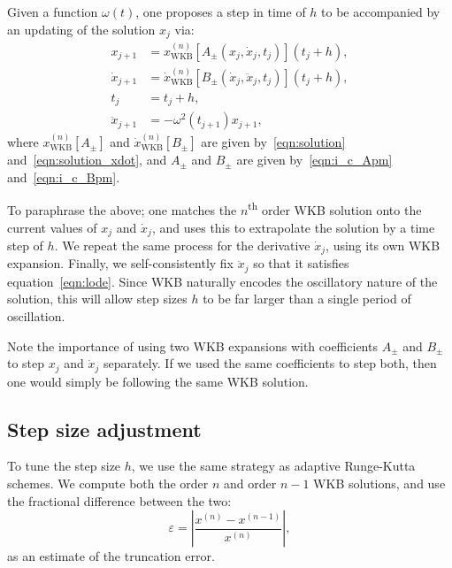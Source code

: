 Given a function \(\omega(t)\), one proposes a step in time of \(h\) to be accompanied by an updating of the solution \(x_j\) via:
\begin{align}
  x_{j+1} &= x_\mathrm{WKB}^{(n)}[A_\pm(x_j,\dot{x}_j,t_j)](t_j+h),
  \label{eqn:WKB_x_step} \\
  \dot{x}_{j+1} &= \dot{x}_\mathrm{WKB}^{(n)}[B_\pm(\dot{x}_j,\ddot{x}_j,t_j)](t_j+h),
  \label{eqn:WKB_xdot_step} \\
  t_j &= t_j+h,
  \label{eqn:WKB_t_step} \\
  \ddot{x}_{j+1} &= -\omega^2(t_{j+1})x_{j+1},
  \label{eqn:WKB_xddot} 
\end{align}
where \(x_\mathrm{WKB}^{(n)}[A_{\pm}]\) and \(\dot{x}_\mathrm{WKB}^{(n)}[B_{\pm}]\) are given by~\eqref{eqn:solution} and~\eqref{eqn:solution_xdot},  and \(A_{\pm}\) and \(B_{\pm}\)  are given by~\eqref{eqn:i_c_Apm} and~\eqref{eqn:i_c_Bpm}.

To paraphrase the above; one matches the \(n\)\textsuperscript{th} order WKB solution onto the current values of \(x_j\) and \(\dot{x}_j\), and uses this to extrapolate the solution by a time step of \(h\). We repeat the same process for the derivative \(\dot{x}_j\), using its own WKB expansion. Finally, we self-consistently fix \(\ddot{x}_j\) so that it satisfies equation~\eqref{eqn:lode}. Since WKB naturally encodes the oscillatory nature of the solution, this will allow step sizes \(h\) to be far larger than a single period of oscillation. 

Note the importance of using two WKB expansions with coefficients \(A_\pm\) and \(B_\pm\) to step \(x_j\) and \(\dot{x}_j\) separately. If we used the same coefficients to step both, then one would simply be following the same WKB solution.

\subsection{Step size adjustment}
To tune the step size \(h\), we use the same strategy as adaptive Runge-Kutta schemes. We compute both the order \(n\) and order \(n-1\) WKB solutions, and use the fractional difference between the two:
\begin{equation}
  \varepsilon = \left|\frac{x^{(n)}-x^{(n-1)}}{x^{(n)}}\right|,
  \nonumber
\end{equation}
as an estimate of the truncation error. 

